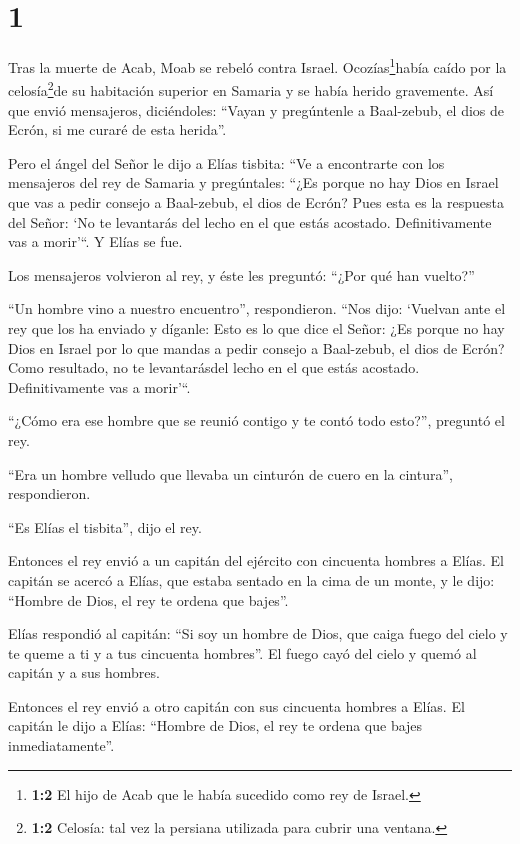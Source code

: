 \hypertarget{section}{%
\section{1}\label{section}}

 Tras la muerte de Acab, Moab se rebeló contra Israel.
 Ocozías\footnote{\textbf{1:2} El hijo de Acab que le había
  sucedido como rey de Israel.}había caído por la celosía\footnote{\textbf{1:2}
  Celosía: tal vez la persiana utilizada para cubrir una ventana.}de su
habitación superior en Samaria y se había herido gravemente. Así que
envió mensajeros, diciéndoles: ``Vayan y pregúntenle a Baal-zebub, el
dios de Ecrón, si me curaré de esta herida''.

 Pero el ángel del Señor le dijo a Elías tisbita: ``Ve a
encontrarte con los mensajeros del rey de Samaria y pregúntales: ``¿Es
porque no hay Dios en Israel que vas a pedir consejo a Baal-zebub, el
dios de Ecrón?  Pues esta es la respuesta del Señor: `No te
levantarás del lecho en el que estás acostado. Definitivamente vas a
morir'``. Y Elías se fue.

 Los mensajeros volvieron al rey, y éste les preguntó:
``¿Por qué han vuelto?''

 ``Un hombre vino a nuestro encuentro'', respondieron. ``Nos
dijo: `Vuelvan ante el rey que los ha enviado y díganle: Esto es lo que
dice el Señor: ¿Es porque no hay Dios en Israel por lo que mandas a
pedir consejo a Baal-zebub, el dios de Ecrón? Como resultado, no te
levantarásdel lecho en el que estás acostado. Definitivamente vas a
morir'``.

 ``¿Cómo era ese hombre que se reunió contigo y te contó
todo esto?'', preguntó el rey.

 ``Era un hombre velludo que llevaba un cinturón de cuero en
la cintura'', respondieron.

``Es Elías el tisbita'', dijo el rey.

 Entonces el rey envió a un capitán del ejército con
cincuenta hombres a Elías. El capitán se acercó a Elías, que estaba
sentado en la cima de un monte, y le dijo: ``Hombre de Dios, el rey te
ordena que bajes''.

 Elías respondió al capitán: ``Si soy un hombre de Dios,
que caiga fuego del cielo y te queme a ti y a tus cincuenta hombres''.
El fuego cayó del cielo y quemó al capitán y a sus hombres.

 Entonces el rey envió a otro capitán con sus cincuenta
hombres a Elías. El capitán le dijo a Elías: ``Hombre de Dios, el rey te
ordena que bajes inmediatamente''.

